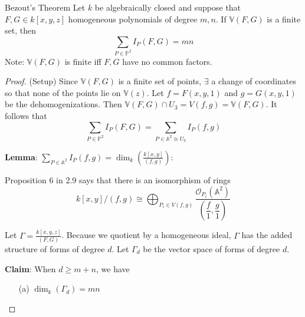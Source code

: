 \documentclass{report}
\begin{document}
\begin{theorem}{Bezout's Theorem}
    Let $k$ be algebraically closed and suppose that $F, G \in k[x, y, z]$ homogeneous polynomials of degree $m, n$. If $\mathbb{V}(F, G)$ is a finite set, then
        \begin{equation*}
            \sum_{P \in \mathbb{P}^{2}}I_{P}(F, G) = mn
        \end{equation*}
    Note: $\mathbb{V}(F, G)$ is finite iff $F, G$ have no common factors.
\end{theorem}
    \begin{proof}
        (Setup) Since $\mathbb{V}(F, G)$ is a finite set of points, $\exists$ a change of coordinates so that none of the points lie on $\mathbb{V}(z)$. Let $f = F(x, y, 1)$ and $g = G(x, y, 1)$ be the dehomogenizations. Then $\mathbb{V}(F, G) \cap U_{3} = V(f, g) = \mathbb{V}(F, G)$. It follows that 
            \begin{equation*}
                \sum_{P \in \mathbb{P}^{2}} I_{P}(F, G) = \sum_{P \in \mathbb{A}^{2} \cong U_{3}}I_{P}(f, g)
            \end{equation*}

        \textbf{Lemma}: $\sum_{P \in \mathbb{A}^{2}}I_{P}(f, g) = \dim_{k}\left(\frac{k[x, y]}{(f, g)}\right)$:

        Proposition $6$ in 2.9 says that there is an isomorphism of rings 
            \begin{equation*}
                k[x, y]/(f, g) \cong \bigoplus_{P_{i} \in V(f, g)}\dfrac{\mathcal{O}_{P_{i}}(\mathbb{A}^{2})}{\left(\dfrac{f}{1}, \dfrac{g}{1}\right)}
            \end{equation*}

        Let $\Gamma = \frac{k[x, y, z]}{(F, G)}$. Because we quotient by a homogeneous ideal, $\Gamma$ has the added structure of forms of degree $d$. Let $\Gamma_{d}$ be the vector space of forms of degree $d$. 

        \textbf{Claim}: When $d \geq m + n$, we have 
            \begin{itemize}
                \item [(a)] $\dim_{k}(\Gamma_{d}) = mn$


\end{itemize}
\end{proof}
\end{document}

